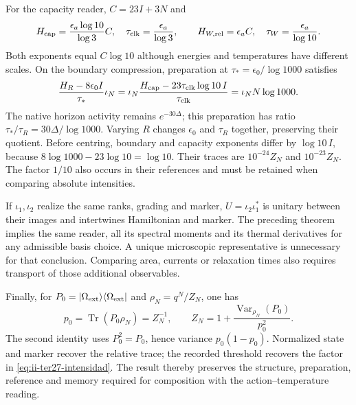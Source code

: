 For the capacity reader, $C=23I+3N$ and
\begin{equation}
 H_{\rm cap}=\frac{\epsilon_a\log10}{\log3}C,
 \quad\tau_{\rm clk}=\frac{\epsilon_a}{\log3},\qquad
 H_{W,\rm rel}=\epsilon_a C,
 \quad\tau_W=\frac{\epsilon_a}{\log10}.
 \label{eq:ii-ter27-hcap}
\end{equation}
Both exponents equal $C\log10$ although energies and temperatures have
different scales. On the boundary compression, preparation at
$\tau_*=\epsilon_0/\log1000$ satisfies
\[
 \frac{H_R-8\epsilon_0I}{\tau_*}\iota_N
 =\iota_N\frac{H_{\rm cap}-23\tau_{\rm clk}\log10\,I}{\tau_{\rm clk}}
 =\iota_N N\log1000.
\]
The native horizon activity remains $e^{-30\Delta}$; this preparation
has ratio $\tau_*/\tau_R=30\Delta/\log1000$. Varying $R$ changes
$\epsilon_0$ and $\tau_R$ together, preserving their quotient.
Before centring, boundary and capacity exponents differ by
$\log10\,I$, because $8\log1000-23\log10=\log10$. Their traces are
$10^{-24}Z_N$ and $10^{-23}Z_N$. The factor $1/10$ also occurs in
their references and must be retained when comparing absolute intensities.

If $\iota_1,\iota_2$ realize the same ranks, grading and marker,
$U=\iota_2\iota_1^*$ is unitary between their images and intertwines
Hamiltonian and marker. The preceding theorem implies the same reader,
all its spectral moments and its thermal derivatives for any admissible
basis choice. A unique microscopic representative is unnecessary for
that conclusion. Comparing area, currents or relaxation times also
requires transport of those additional observables.

Finally, for
$P_0=|\Omega_{\rm ext}\rangle\langle\Omega_{\rm ext}|$ and
$\rho_N=q^N/Z_N$, one has
\[
 p_0=\operatorname{Tr}(P_0\rho_N)=Z_N^{-1},\qquad
 Z_N=1+\frac{\operatorname{Var}_{\rho_N}(P_0)}{p_0^2}.
\]
The second identity uses $P_0^2=P_0$, hence variance $p_0(1-p_0)$.
Normalized state and marker recover the relative trace; the recorded
threshold recovers the factor in \eqref{eq:ii-ter27-intensidad}.
The result thereby preserves the structure, preparation, reference and
memory required for composition with the action--temperature reading.
